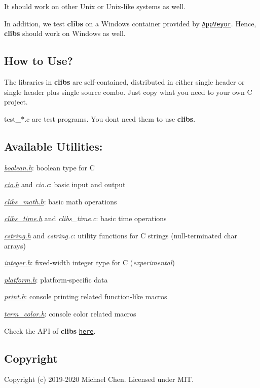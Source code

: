 It should work on other Unix or Unix-\/like systems as well.

In addition, we test {\bfseries clibs} on a Windows container provided by \href{https://www.appveyor.com/}{\tt App\+Veyor}. Hence, {\bfseries clibs} should work on Windows as well.

\subsection*{How to Use?}

The libraries in {\bfseries clibs} are self-\/contained, distributed in either single header or single header plus single source combo. Just copy what you need to your own C project.

test\+\_\+$\ast$.c are test programs. You don\textquotesingle{}t need them to use {\bfseries clibs}.

\subsection*{Available Utilities\+:}


\begin{DoxyItemize}
\item {\itshape \hyperlink{boolean_8h}{boolean.\+h}}\+: boolean type for C
\item {\itshape \hyperlink{cio_8h}{cio.\+h}} and {\itshape cio.\+c}\+: basic input and output
\item {\itshape \hyperlink{clibs__math_8h}{clibs\+\_\+math.\+h}}\+: basic math operations
\item {\itshape \hyperlink{clibs__time_8h}{clibs\+\_\+time.\+h}} and {\itshape clibs\+\_\+time.\+c}\+: basic time operations
\item {\itshape \hyperlink{cstring_8h}{cstring.\+h}} and {\itshape cstring.\+c}\+: utility functions for C strings (null-\/terminated {\ttfamily char} arrays)
\item {\itshape \hyperlink{integer_8h}{integer.\+h}}\+: fixed-\/width integer type for C ({\itshape experimental})
\item {\itshape \hyperlink{platform_8h}{platform.\+h}}\+: platform-\/specific data
\item {\itshape \hyperlink{print_8h}{print.\+h}}\+: console printing related function-\/like macros
\item {\itshape \hyperlink{term__color_8h}{term\+\_\+color.\+h}}\+: console color related macros
\end{DoxyItemize}

Check the A\+PI of {\bfseries clibs} \href{https://cwchentw.github.io/clibs/html/index.html}{\tt here}.

\subsection*{Copyright}

Copyright (c) 2019-\/2020 Michael Chen. Licensed under M\+IT. 